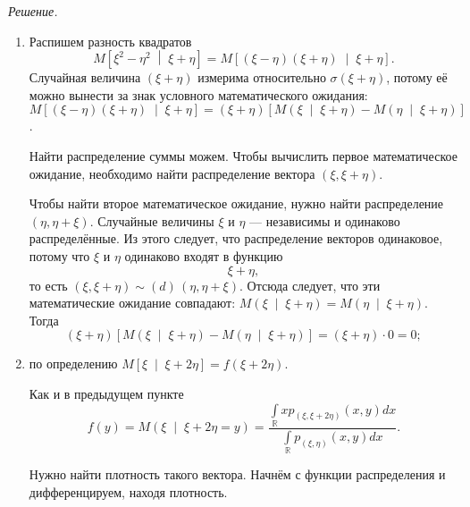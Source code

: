 \textit{Решение.}
\begin{enumerate}[label=\alph*)]
  \item Распишем разность квадратов
  $$M \left[ \xi^2 - \eta^2 \; \middle| \; \xi + \eta \right] =
    M \left[
      \left( \xi - \eta \right) \left( \xi + \eta \right) \; \middle| \; \xi + \eta
    \right].$$
  Случайная величина $ \left( \xi + \eta \right) $ измерима относительно
  $ \sigma \left( \xi + \eta \right) $,
  потому её можно вынести за знак условного математического ожидания:
  $M \left[
      \left( \xi - \eta \right) \left( \xi + \eta \right) \; \middle| \; \xi + \eta
    \right] =
    \left( \xi + \eta \right) \left[ M \left( \xi \; \middle| \; \xi + \eta \right) -
    M \left( \eta \; \middle| \; \xi + \eta \right) \right] $.

  Найти распределение суммы можем.
  Чтобы вычислить первое математическое ожидание,
  необходимо найти распределение вектора $ \left( \xi, \xi + \eta \right) $.

  Чтобы найти второе математическое ожидание,
  нужно найти распределение $ \left( \eta, \eta + \xi \right) $.
  Случайные величины $ \xi $ и $ \eta $ --- независимы и одинаково распределённые.
  Из этого следует, что распределение векторов одинаковое,
  потому что $ \xi $ и $ \eta $ одинаково входят в функцию
  $$ \xi + \eta,$$
  то есть
  $ \left( \xi, \xi + \eta \right) \sim \left( d \right) \,
    \left( \eta, \eta + \xi \right) $.
  Отсюда следует, что эти математические ожидание совпадают:
  $M \left( \xi \; \middle| \; \xi + \eta \right) =
    M \left( \eta \; \middle| \; \xi + \eta \right) $.
  Тогда
  $$ \left( \xi + \eta \right) \left[ M \left( \xi \; \middle| \; \xi + \eta \right) -
    M \left( \eta \; \middle| \; \xi + \eta \right) \right] =
    \left( \xi + \eta \right) \cdot 0 =
    0;$$
  \item по определению
  $M \left[ \xi \; \middle| \; \xi + 2 \eta \right] =
    f \left( \xi + 2 \eta \right) $.

  Как и в предыдущем пункте
  $$f \left( y \right) =
    M \left( \xi \; \middle| \; \xi + 2 \eta = y \right) =
    \frac{ \int \limits_{ \mathbb{R}} xp_{ \left( \xi, \xi + 2 \eta \right) } \left( x, y \right) dx}{ \int \limits_{ \mathbb{R}} p_{ \left( \xi, \eta \right) } \left( x, y \right) dx}.$$

  Нужно найти плотность такого вектора.
  Начнём с функции распределения и дифференцируем, находя плотность.


\end{enumerate}
